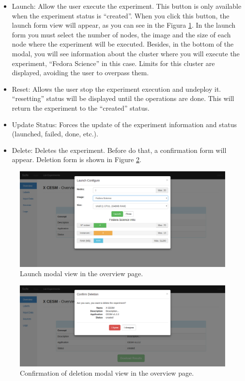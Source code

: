 \documentclass[11pt]{article}
\begin{document}
\begin{itemize}
	\item
Launch: Allow the user execute the experiment. This button is only available when the experiment status is ``created''. When you click this button, the launch form view will appear, as you can see in the Figura \ref{fig:overview-launch}. In the launch form you must select the number of nodes, the image and the size of each node where the experiment will be executed. Besides, in the bottom of the modal, you will see information about the cluster where you will execute the experiment, ``Fedora Science'' in this case. Limits for this cluster are displayed, avoiding the user to overpass them.
	\item 
Reset: Allows the user stop the experiment execution and undeploy it. ``resetting'' status will be displayed until the operations are done. This will return the experiment to the ``created'' status.
	\item
Update Status: Forces the update of the experiment information and status (launched, failed, done, etc.).
	\item
Delete: Deletes the experiment. Before do that, a confirmation form will appear. Deletion form is shown in Figure \ref{fig:overview-delete}.
\end{itemize}

\begin{figure}[htp]
	\centering
	\includegraphics[width=\linewidth]{img/overview-launch}
	\caption{Launch modal view in the overview page.}
	\label{fig:overview-launch}
\end{figure}
\begin{figure}[htp]
	\centering
	\includegraphics[width=\linewidth]{img/overview-delete}
	\caption{Confirmation of deletion modal view in the overview page.}
	\label{fig:overview-delete}
\end{figure}
\end{document}
